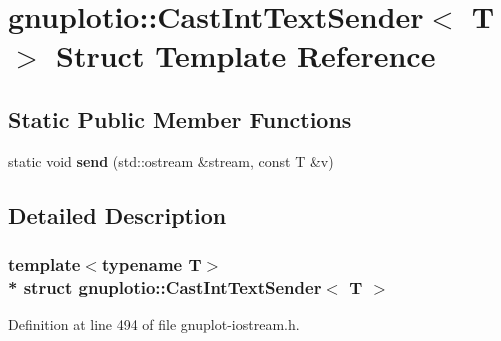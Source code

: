\hypertarget{structgnuplotio_1_1_cast_int_text_sender}{}\section{gnuplotio\+:\+:Cast\+Int\+Text\+Sender$<$ T $>$ Struct Template Reference}
\label{structgnuplotio_1_1_cast_int_text_sender}
\subsection*{Static Public Member Functions}
\begin{DoxyCompactItemize}
\item 
static void {\bfseries send} (std\+::ostream \&stream, const T \&v)\hypertarget{structgnuplotio_1_1_cast_int_text_sender_a42733f83f843a375437e7e5f716ea65e}{}\label{structgnuplotio_1_1_cast_int_text_sender_a42733f83f843a375437e7e5f716ea65e}

\end{DoxyCompactItemize}


\subsection{Detailed Description}
\subsubsection*{template$<$typename T$>$\\*
struct gnuplotio\+::\+Cast\+Int\+Text\+Sender$<$ T $>$}



Definition at line 494 of file gnuplot-\/iostream.\+h.

